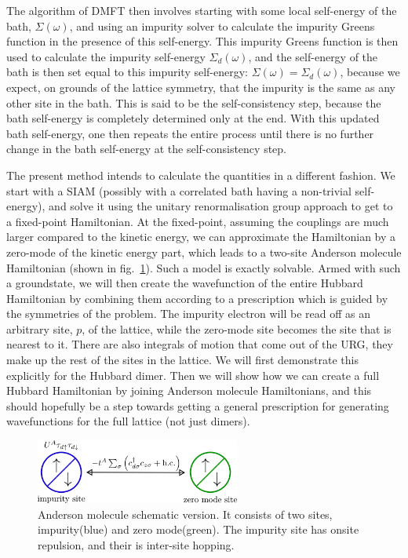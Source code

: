 \documentclass[12pt]{article}
\numberwithin{equation}{section}
\begin{document}
The algorithm of DMFT then involves starting with some local self-energy of the bath, \(\Sigma(\omega)\), and using an impurity solver to calculate the impurity Greens function in the presence of this self-energy. This impurity Greens function is then used to calculate the impurity self-energy \(\Sigma_d(\omega)\), and the self-energy of the bath is then set equal to this impurity self-energy: \(\Sigma(\omega) = \Sigma_d(\omega)\), because we expect, on grounds of the lattice symmetry, that the impurity is the same as any other site in the bath. This is said to be the self-consistency step, because the bath self-energy is completely determined only at the end. With this updated bath self-energy, one then repeats the entire process until there is no further change in the bath self-energy at the self-consistency step.


The present method intends to calculate the quantities in a different fashion. We start with a SIAM (possibly with a correlated bath having a non-trivial self-energy), and solve it using the unitary renormalisation group approach to get to a fixed-point Hamiltonian. At the fixed-point, assuming the couplings are much larger compared to the kinetic energy, we can approximate the Hamiltonian by a zero-mode of the kinetic energy part, which leads to a two-site Anderson molecule Hamiltonian (shown in fig.~\ref{and_mol}). Such a model is exactly solvable. Armed with such a groundstate, we will then create the wavefunction of the entire Hubbard Hamiltonian by combining them according to a prescription which is guided by the symmetries of the problem. The impurity electron will be read off as an arbitrary site, \(p\), of the lattice, while the zero-mode site becomes the site that is nearest to it. There are also integrals of motion that come out of the URG, they make up the rest of the sites in the lattice. We will first demonstrate this explicitly for the Hubbard dimer. Then we will show how we can create a full Hubbard Hamiltonian by joining Anderson molecule Hamiltonians, and this should hopefully be a step towards getting a general prescription for generating wavefunctions for the full lattice (not just dimers).

\begin{figure}[htpb]
	\centering
	\includegraphics[width=0.6\textwidth]{./gen_siam.png}
	\caption{Anderson molecule schematic version. It consists of two sites, impurity(blue) and zero mode(green). The impurity site has onsite repulsion, and their is inter-site hopping.}
	\label{and_mol}
\end{figure}
\end{document}
